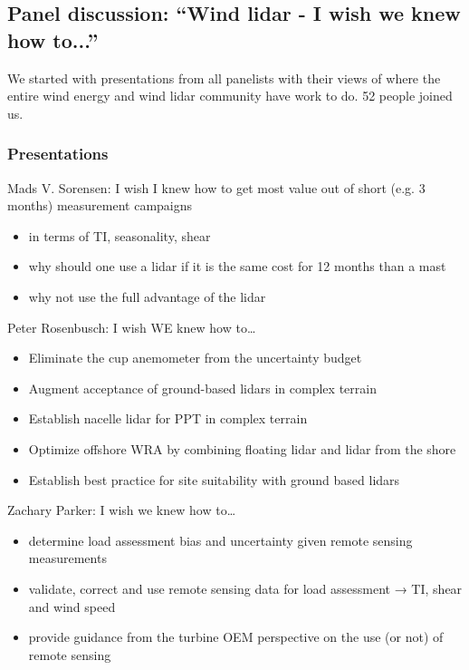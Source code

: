 \subsection{Panel discussion: \enquote{Wind lidar - I wish we knew how to...}}

We started with presentations from all panelists with their views
of where the entire wind energy and wind lidar community have work to
do. 52 people joined us.

\subsubsection{Presentations}

Mads V. Sorensen: I wish I knew how to get most value out of short (e.g. 3 months) measurement campaigns

\begin{itemize}
    \item in terms of TI, seasonality, shear
    \item why should one use a lidar if it is the same cost for 12 months than a mast
    \item why not use the full advantage of the lidar
\end{itemize}

Peter Rosenbusch: I wish WE knew how to\ldots{}

\begin{itemize}
    \item Eliminate the cup anemometer from the uncertainty budget
    \item Augment acceptance of ground-based lidars in complex terrain
    \item Establish nacelle lidar for PPT in complex terrain
    \item Optimize offshore WRA by combining floating lidar and lidar from the shore
    \item Establish best practice for site suitability with ground based lidars
\end{itemize}

Zachary Parker: I wish we knew how to\ldots{}

\begin{itemize}
    \item determine load assessment bias and uncertainty given remote sensing measurements
    \item validate, correct and use remote sensing data for load assessment → TI, shear and wind speed
    \item provide guidance from the turbine OEM perspective on the use (or not) of remote sensing
\end{itemize}

